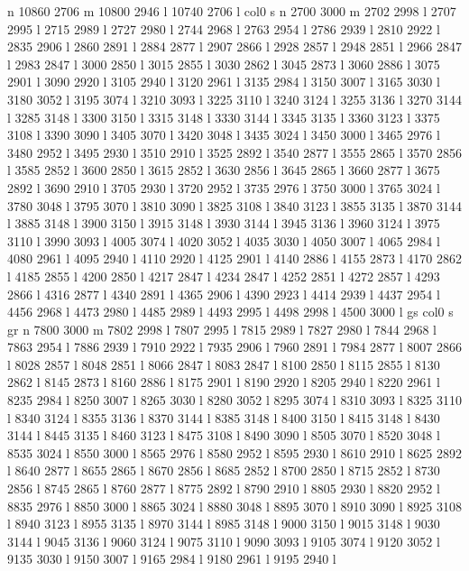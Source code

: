 n 10860 2706 m 10800 2946 l 10740 2706 l  col0 s
n 2700 3000 m 2702 2998 l 2707 2995 l 2715 2989 l 2727 2980 l 2744 2968 l
 2763 2954 l 2786 2939 l 2810 2922 l 2835 2906 l 2860 2891 l
 2884 2877 l 2907 2866 l 2928 2857 l 2948 2851 l 2966 2847 l
 2983 2847 l 3000 2850 l 3015 2855 l 3030 2862 l 3045 2873 l
 3060 2886 l 3075 2901 l 3090 2920 l 3105 2940 l 3120 2961 l
 3135 2984 l 3150 3007 l 3165 3030 l 3180 3052 l 3195 3074 l
 3210 3093 l 3225 3110 l 3240 3124 l 3255 3136 l 3270 3144 l
 3285 3148 l 3300 3150 l 3315 3148 l 3330 3144 l 3345 3135 l
 3360 3123 l 3375 3108 l 3390 3090 l 3405 3070 l 3420 3048 l
 3435 3024 l 3450 3000 l 3465 2976 l 3480 2952 l 3495 2930 l
 3510 2910 l 3525 2892 l 3540 2877 l 3555 2865 l 3570 2856 l
 3585 2852 l 3600 2850 l 3615 2852 l 3630 2856 l 3645 2865 l
 3660 2877 l 3675 2892 l 3690 2910 l 3705 2930 l 3720 2952 l
 3735 2976 l 3750 3000 l 3765 3024 l 3780 3048 l 3795 3070 l
 3810 3090 l 3825 3108 l 3840 3123 l 3855 3135 l 3870 3144 l
 3885 3148 l 3900 3150 l 3915 3148 l 3930 3144 l 3945 3136 l
 3960 3124 l 3975 3110 l 3990 3093 l 4005 3074 l 4020 3052 l
 4035 3030 l 4050 3007 l 4065 2984 l 4080 2961 l 4095 2940 l
 4110 2920 l 4125 2901 l 4140 2886 l 4155 2873 l 4170 2862 l
 4185 2855 l 4200 2850 l 4217 2847 l 4234 2847 l 4252 2851 l
 4272 2857 l 4293 2866 l 4316 2877 l 4340 2891 l 4365 2906 l
 4390 2923 l 4414 2939 l 4437 2954 l 4456 2968 l 4473 2980 l
 4485 2989 l 4493 2995 l 4498 2998 l 4500 3000 l gs col0 s gr 
n 7800 3000 m 7802 2998 l 7807 2995 l 7815 2989 l 7827 2980 l 7844 2968 l
 7863 2954 l 7886 2939 l 7910 2922 l 7935 2906 l 7960 2891 l
 7984 2877 l 8007 2866 l 8028 2857 l 8048 2851 l 8066 2847 l
 8083 2847 l 8100 2850 l 8115 2855 l 8130 2862 l 8145 2873 l
 8160 2886 l 8175 2901 l 8190 2920 l 8205 2940 l 8220 2961 l
 8235 2984 l 8250 3007 l 8265 3030 l 8280 3052 l 8295 3074 l
 8310 3093 l 8325 3110 l 8340 3124 l 8355 3136 l 8370 3144 l
 8385 3148 l 8400 3150 l 8415 3148 l 8430 3144 l 8445 3135 l
 8460 3123 l 8475 3108 l 8490 3090 l 8505 3070 l 8520 3048 l
 8535 3024 l 8550 3000 l 8565 2976 l 8580 2952 l 8595 2930 l
 8610 2910 l 8625 2892 l 8640 2877 l 8655 2865 l 8670 2856 l
 8685 2852 l 8700 2850 l 8715 2852 l 8730 2856 l 8745 2865 l
 8760 2877 l 8775 2892 l 8790 2910 l 8805 2930 l 8820 2952 l
 8835 2976 l 8850 3000 l 8865 3024 l 8880 3048 l 8895 3070 l
 8910 3090 l 8925 3108 l 8940 3123 l 8955 3135 l 8970 3144 l
 8985 3148 l 9000 3150 l 9015 3148 l 9030 3144 l 9045 3136 l
 9060 3124 l 9075 3110 l 9090 3093 l 9105 3074 l 9120 3052 l
 9135 3030 l 9150 3007 l 9165 2984 l 9180 2961 l 9195 2940 l
